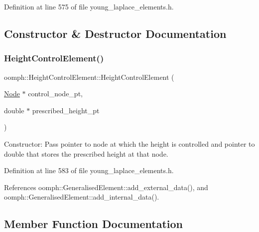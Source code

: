 Definition at line 575 of file young\+\_\+laplace\+\_\+elements.\+h.



\subsection{Constructor \& Destructor Documentation}
\mbox{\label{classoomph_1_1HeightControlElement_abb74c76bc5615a50794d1d26711f1203}} 
\subsubsection{\texorpdfstring{Height\+Control\+Element()}{HeightControlElement()}}
{\footnotesize\ttfamily oomph\+::\+Height\+Control\+Element\+::\+Height\+Control\+Element (\begin{DoxyParamCaption}\item[{\hyperlink{classoomph_1_1Node}{Node} $\ast$}]{control\+\_\+node\+\_\+pt,  }\item[{double $\ast$}]{prescribed\+\_\+height\+\_\+pt }\end{DoxyParamCaption})\hspace{0.3cm}{\ttfamily [inline]}}

Constructor\+: Pass pointer to node at which the height is controlled and pointer to double that stores the prescribed height at that node. 

Definition at line 583 of file young\+\_\+laplace\+\_\+elements.\+h.



References oomph\+::\+Generalised\+Element\+::add\+\_\+external\+\_\+data(), and oomph\+::\+Generalised\+Element\+::add\+\_\+internal\+\_\+data().



\subsection{Member Function Documentation}
\mbox{\label{classoomph_1_1HeightControlElement_a1d14c779f9ca1dcf26864406d6d32adb}} 
